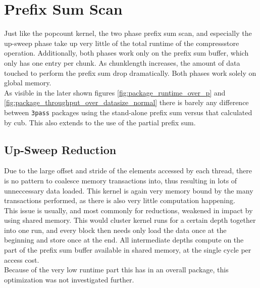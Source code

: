 \documentclass{tudscrreprt}
\begin{document}
		\section{Prefix Sum Scan}
			Just like the popcount kernel, the two phase prefix sum scan, and especially the up-sweep phase take up very little of the total runtime of the compressstore operation. Additionally, both phases work only on the prefix sum buffer, which only has one entry per chunk. As chunklength increases, the amount of data touched to perform the prefix sum drop dramatically. Both phases work solely on global memory. \\
		
			As visible in the later shown figures \ref{fig:package_runtime_over_p} and \ref{fig:package_throughput_over_datasize_normal} there is barely any difference between \texttt{3pass} packages using the stand-alone prefix sum versus that calculated by cub. This also extends to the use of the partial prefix sum. \\
		
			\subsection{Up-Sweep Reduction}
				Due to the large offset and stride of the elements accessed by each thread, there is no pattern to coalesce memory transactions into, thus resulting in lots of unneccessary data loaded. This kernel is again very memory bound by the many transactions performed, as there is also very little computation happening. \\
				This issue is usually, and most commonly for reductions, weakened in impact by using shared memory. This would cluster kernel runs for a certain depth together into one run, and every block then needs only load the data once at the beginning and store once at the end. All intermediate depths compute on the part of the prefix sum buffer available in shared memory, at the single cycle per access cost. \\
				Because of the very low runtime part this has in an overall package, this optimization was not investigated further. \\
			 
\end{document}
